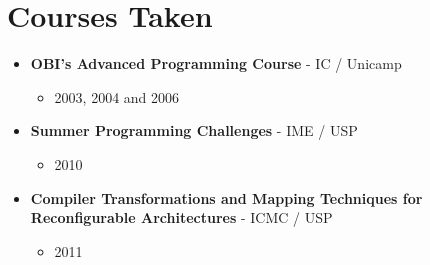 \documentclass[a4paper,10pt]{article}
\begin{document}
  \section{Courses Taken}
    \begin{itemize}
      \item 
        \textbf{OBI's Advanced Programming Course} - IC / Unicamp
        \begin{itemize}
          \item 2003, 2004 and 2006
        \end{itemize}
      \item 
        \textbf{Summer Programming Challenges} - IME / USP
        \begin{itemize}
          \item 2010
        \end{itemize}
      \item 
        \textbf{Compiler Transformations and Mapping Techniques for Reconfigurable Architectures} - ICMC / USP
        \begin{itemize}
          \item 2011
        \end{itemize}
    \end{itemize}
\end{document}
